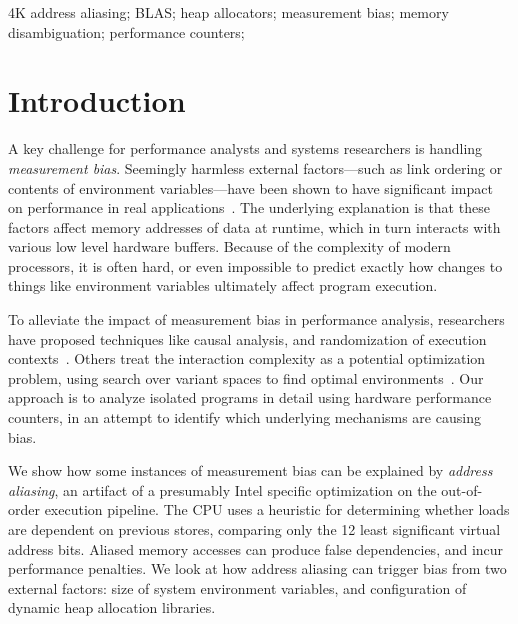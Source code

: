\documentclass[10pt, conference, compsocconf]{IEEEtran}
\begin{document}
\begin{IEEEkeywords}
4K address aliasing; BLAS; heap allocators; measurement bias; memory disambiguation; performance counters;
\end{IEEEkeywords}


\section{Introduction}
A key challenge for performance analysts and systems researchers is handling \emph{measurement bias}.
Seemingly harmless external factors---such as link ordering or contents of environment variables---have been shown to have significant impact on performance in real applications~\cite{Mytkowicz:2009:WrongData}.
The underlying explanation is that these factors affect memory addresses of data at runtime, which in turn interacts with various low level hardware buffers.
Because of the complexity of modern processors, it is often hard, or even impossible to predict exactly how changes to things like environment variables ultimately affect program execution.

To alleviate the impact of measurement bias in performance analysis, researchers have proposed techniques like causal analysis, and randomization of execution contexts~\cite{Mytkowicz:2008:OE&MB}.
Others treat the interaction complexity as a potential optimization problem, using search over variant spaces to find optimal environments~\cite{Knights:2009:BlindOpt}.
Our approach is to analyze isolated programs in detail using hardware performance counters, in an attempt to identify which underlying mechanisms are causing bias.

We show how some instances of measurement bias can be explained by \emph{address aliasing}, an artifact of a presumably Intel specific optimization on the out-of-order execution pipeline.
The CPU uses a heuristic for determining whether loads are dependent on previous stores, comparing only the 12 least significant virtual address bits.
Aliased memory accesses can produce false dependencies, and incur performance penalties.
We look at how address aliasing can trigger bias from two external factors: size of system environment variables, and configuration of dynamic heap allocation libraries.
\end{document}

